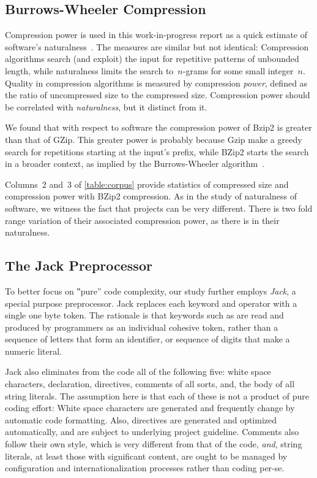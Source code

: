 \subsection{Burrows-Wheeler Compression}
Compression power is used in this work-in-progress report as a quick estimate
of software's naturalness~\cite{Hindle:Bar:Su:Gabel:Devanbu:2012}. The
measures are similar but not identical: Compression algorithms search
(and exploit) the input for repetitive patterns of unbounded length, while
naturalness limits the search to~$n$-grams for some small integer~$n$. Quality
in compression algorithms is measured by compression \emph{power}, defined as
the ratio of uncompressed size to the compressed size. Compression power should
be correlated with \emph{naturalness}, but it distinct from it.

We found that with respect to \Java software the compression power of Bzip2 is
greater than that of GZip. This greater power is probably because Gzip make a
greedy search for repetitions starting at the input's prefix, while BZip2
starts the search in a broader context, as implied by the Burrows-Wheeler
algorithm~\cite{Burrows:Wheeler:94}.

Columns~2 and~3 of \cref{table:corpus} provide statistics of compressed size and
compression power with BZip2 compression. As in the
study of naturalness of software, we witness the fact that projects can be very
different. There is two fold range variation of their associated compression
power, as there is in their naturalness.

\subsection{The Jack Preprocessor}

To better focus on ‟pure” code complexity, our study further employs
\emph{Jack}, a special purpose preprocessor. Jack replaces each keyword and
operator with a single one byte token. The rationale is that keywords such as
 are read and produced by programmers as an individual cohesive
token, rather than a sequence of letters that form an identifier, or sequence
of digits that make a numeric literal.

Jack also eliminates from the \Java code all of the following five: white space
characters,  declaration,  directives, comments of all
sorts, and, the body of all string literals. The assumption here is that each
of these is not a product of pure coding effort: White space characters are
generated and frequently change by automatic code formatting. Also, 
directives are generated and optimized automatically, and are subject to
underlying project guideline. Comments also follow their own style, which is
very different from that of the code, \emph{and}, string literals, at least
those with significant content, are ought to be managed by configuration and
internationalization processes rather than coding per-se.

